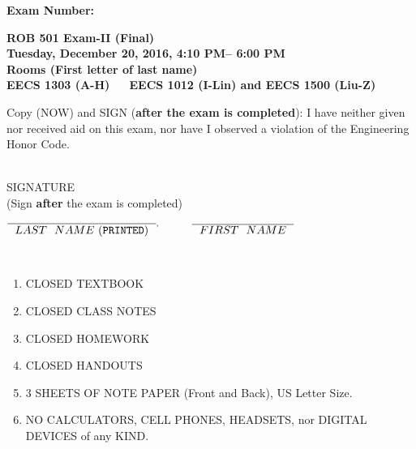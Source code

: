 \documentclass[letterpaper]{article}
\newcommand{\bline}[1]{\underline{\hspace*{#1}}}
\begin{document}

\begin{flushright}
{\bf Exam Number:}\bline{0.6in}
\end{flushright}

\vspace*{.1in}
\begin{center}
\LARGE \bf
ROB 501 Exam-II (Final)\\
\large
Tuesday, December 20, 2016, 4:10 PM-- 6:00 PM \\
Rooms (First letter of last name)\\
EECS 1303 (A-H)~~~EECS 1012 (I-Lin) and EECS 1500 (Liu-Z) \\
\end{center}

\vspace*{0.5in}

 Copy (NOW) and SIGN ({\bf after the exam is completed}): I have neither given nor received aid on this exam, nor have I observed a violation of the
Engineering Honor Code.

\vspace*{1in}
\begin{flushright}
\underline{\hspace*{1.in}} \\
SIGNATURE \\
(Sign {\bf after} the exam is completed)
\end{flushright}

\vspace*{1in}

\begin{center}
$\overline{\mathrm ~~LAST~~NAME~ ({\tt PRINTED})~~}^, \hspace*{.4in} \overline{\mathrm ~~FIRST~~NAME~~}$ \\

\vspace*{2cm}

 \\

\end{center}

\vspace*{.45in} 
\begin{enumerate}
\item CLOSED TEXTBOOK
\item CLOSED CLASS NOTES
\item CLOSED HOMEWORK
\item CLOSED HANDOUTS
\item 3  SHEETS OF NOTE PAPER (Front and Back), US Letter Size.
\item NO CALCULATORS, CELL PHONES, HEADSETS, nor DIGITAL DEVICES of any KIND.
\end{enumerate}
\vspace*{.4in}
\end{document}
